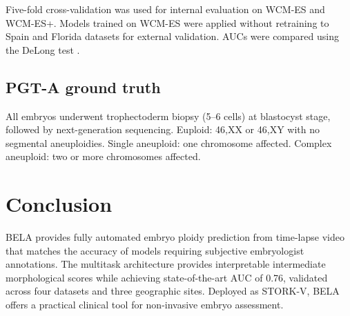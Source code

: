 \documentclass[11pt]{article}
\begin{document}
Five-fold cross-validation was used for internal evaluation on WCM-ES and WCM-ES+. Models trained on WCM-ES were applied without retraining to Spain and Florida datasets for external validation. AUCs were compared using the DeLong test \citep{barnes2023}.

\subsection{PGT-A ground truth}

All embryos underwent trophectoderm biopsy (5--6 cells) at blastocyst stage, followed by next-generation sequencing. Euploid: 46,XX or 46,XY with no segmental aneuploidies. Single aneuploid: one chromosome affected. Complex aneuploid: two or more chromosomes affected.

\section{Conclusion}

BELA provides fully automated embryo ploidy prediction from time-lapse video that matches the accuracy of models requiring subjective embryologist annotations. The multitask architecture provides interpretable intermediate morphological scores while achieving state-of-the-art AUC of 0.76, validated across four datasets and three geographic sites. Deployed as STORK-V, BELA offers a practical clinical tool for non-invasive embryo assessment.



\end{document}
